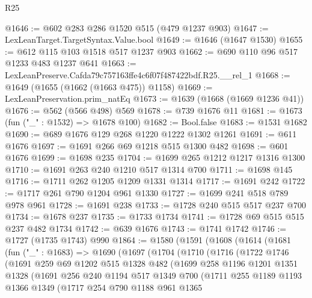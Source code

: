 \begin{lexlean}{R25}
\begin{coremodule}
@1646 := @602 @283 @286 @1520 @515 (@479 @1237 @903)
@1647 := LexLeanTarget.TargetSyntax.Value.bool
@1649 := @1646 (@1647 @1530)
@1655 := @612 @115 @103 @1518 @517 @1237 @903
@1662 := @690 @110 @96 @517 @1233 @483 @1237 @641
@1663 := LexLeanPreserve.Cafda79c757163ffe4c6f07f487422bdf.R25.__rel_1
@1668 := @1649 (@1655 (@1662 (@1663 @475)) @1158)
@1669 := LexLeanPreservation.prim_natEq
@1673 := @1639 (@1668 (@1669 @1236 @41))
@1676 := @562 (@566 @498) @569
@1678 := @739 @1676 @11
@1681 := @1673 (fun ("_" : @1532) => @1678 @100)
@1682 := Bool.false
@1683 := @1531 @1682
@1690 := @689 @1676 @129 @268 @1220 @1222 @1302 @1261
@1691 := @611 @1676
@1697 := @1691 @266 @69 @1218 @515 @1300 @482
@1698 := @601 @1676
@1699 := @1698 @235
@1704 := @1699 @265 @1212 @1217 @1316 @1300
@1710 := @1691 @263 @240 @1210 @517 @1314 @700
@1711 := @1698 @145
@1716 := @1711 @262 @1205 @1209 @1331 @1314
@1717 := @1691 @242
@1722 := @1717 @261 @790 @1204 @961 @1330
@1727 := @1699 @241 @518 @789 @978 @961
@1728 := @1691 @238
@1733 := @1728 @240 @515 @517 @237 @700
@1734 := @1678 @237
@1735 := @1733 @1734
@1741 := @1728 @69 @515 @515 @237 @482 @1734
@1742 := @639 @1676
@1743 := @1741 @1742
@1746 := @1727 (@1735 @1743) @990
@1864 := @1580
    (@1591
      (@1608
        (@1614
          (@1681
            (fun ("_" : @1683) =>
            @1690
              (@1697
                (@1704
                  (@1710
                    (@1716
                      (@1722
                        @1746
                        (@1691
                          @259
                          @69
                          @1202
                          @515
                          @1328
                          @482
                          (@1699
                            @258
                            @1196
                            @1201
                            @1351
                            @1328
                            (@1691
                              @256
                              @240
                              @1194
                              @517
                              @1349
                              @700
                              (@1711
                                @255
                                @1189
                                @1193
                                @1366
                                @1349
                                (@1717
                                  @254
                                  @790
                                  @1188
                                  @961
                                  @1365

\end{coremodule}
\end{lexlean}
